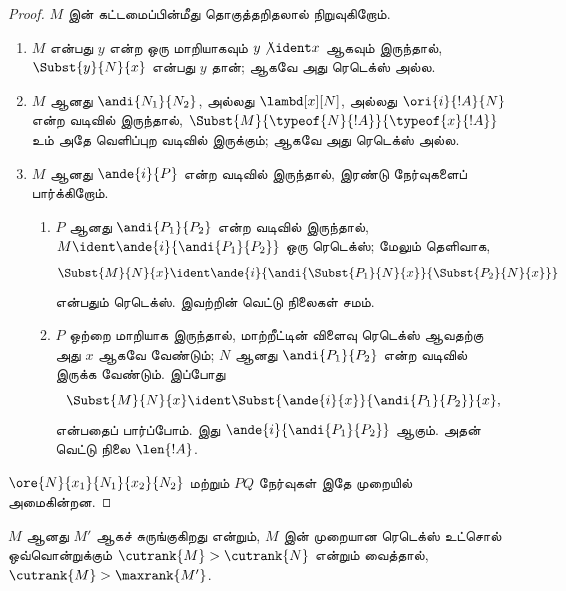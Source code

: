 \documentclass[../../../include/open-logic-section]{subfiles}
\begin{document}
\begin{proof}
  $M$ இன் கட்டமைப்பின்மீது தொகுத்தறிதலால் நிறுவுகிறோம்.
  \begin{enumerate}
  \item $M$ என்பது $y$ என்ற ஒரு மாறியாகவும்
    $y \not\ident x$ ஆகவும் இருந்தால், $\Subst{y}{N}{x}$
    என்பது $y$ தான்; ஆகவே அது ரெடெக்ஸ் அல்ல.
  \item $M$ ஆனது $\andi{N_1}{N_2}$, அல்லது
    $\lambd[x][N]$, அல்லது $\ori{i}{!A}{N}$ என்ற
    வடிவில் இருந்தால்,
    $\Subst{M}{\typeof{N}{!A}}{\typeof{x}{!A}}$ உம்
    அதே வெளிப்புற வடிவில் இருக்கும்; ஆகவே அது ரெடெக்ஸ் அல்ல.
  \item $M$ ஆனது $\ande{i}{P}$ என்ற வடிவில் இருந்தால்,
    இரண்டு நேர்வுகளைப் பார்க்கிறோம்.
    \begin{enumerate}
      \item $P$ ஆனது $\andi{P_1}{P_2}$ என்ற வடிவில்
        இருந்தால், $M \ident \ande{i}{\andi{P_1}{P_2}}$
        ஒரு ரெடெக்ஸ்; மேலும் தெளிவாக,
        \[
        \Subst{M}{N}{x} \ident
        \ande{i}{\andi{\Subst{P_1}{N}{x}}{\Subst{P_2}{N}{x}}}
        \]
        என்பதும் ரெடெக்ஸ். இவற்றின் வெட்டு நிலைகள் சமம்.
      \item $P$ ஒற்றை மாறியாக இருந்தால், மாற்றீட்டின்
        விளைவு ரெடெக்ஸ் ஆவதற்கு அது $x$ ஆகவே வேண்டும்;
        $N$ ஆனது $\andi{P_1}{P_2}$ என்ற வடிவில்
        இருக்க வேண்டும். இப்போது
        \[
        \Subst{M}{N}{x} \ident \Subst{\ande{i}{x}}{\andi{P_1}{P_2}}{x},
        \]
        என்பதைப் பார்ப்போம். இது
        $\ande{i}{\andi{P_1}{P_2}}$ ஆகும். அதன்
        வெட்டு நிலை $\len{!A}$.
    \end{enumerate}
  \end{enumerate}
  $\ore{N}{x_1}{N_1}{x_2}{N_2}$ மற்றும் $P Q$
  நேர்வுகள் இதே முறையில் அமைகின்றன.
\end{proof}

\begin{lem}
  $M$ ஆனது $M'$ ஆகச் சுருங்குகிறது என்றும்,
  $M$ இன் முறையான ரெடெக்ஸ் உட்சொல் ஒவ்வொன்றுக்கும்
  $\cutrank{M} > \cutrank{N}$ என்றும் வைத்தால்,
  $\cutrank{M} > \maxrank{M'}$.
\end{lem}
\end{document}
